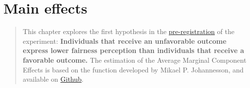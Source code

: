 \documentclass[]{book}
\newenvironment{Shaded}{\begin{snugshade}}{\end{snugshade}}
\newcommand{\KeywordTok}[1]{\textcolor[rgb]{0.13,0.29,0.53}{\textbf{#1}}}
\newcommand{\DataTypeTok}[1]{\textcolor[rgb]{0.13,0.29,0.53}{#1}}
\newcommand{\FloatTok}[1]{\textcolor[rgb]{0.00,0.00,0.81}{#1}}
\newcommand{\StringTok}[1]{\textcolor[rgb]{0.31,0.60,0.02}{#1}}
\newcommand{\CommentTok}[1]{\textcolor[rgb]{0.56,0.35,0.01}{\textit{#1}}}
\newcommand{\OtherTok}[1]{\textcolor[rgb]{0.56,0.35,0.01}{#1}}
\newcommand{\OperatorTok}[1]{\textcolor[rgb]{0.81,0.36,0.00}{\textbf{#1}}}
\newcommand{\NormalTok}[1]{#1}
\begin{document}
\begin{Shaded}
\end{Shaded}

\chapter{Main effects}\label{main-effects-2}

\begin{quote}
This chapter explores the first hypothesis in the
\href{GoogLoser_Prereg_3_\#16823\%5B16065\%5D.pdf}{pre-registration} of
the experiment: \textbf{Individuals that receive an unfavorable outcome
express lower fairness perception than individuals that receive a
favorable outcome.} The estimation of the Average Marginal Component
Effects is based on the function developed by Mikael P. Johannesson, and
available on
\href{https://rdrr.io/github/mikajoh/descr2/man/amce.html}{Github}.
\end{quote}
\end{document}
